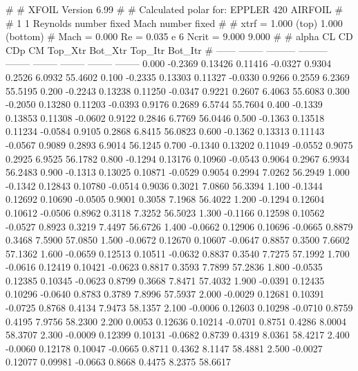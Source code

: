 #  
#       XFOIL         Version 6.99
#  
# Calculated polar for: EPPLER 420 AIRFOIL                              
#  
# 1 1 Reynolds number fixed          Mach number fixed         
#  
# xtrf =   1.000 (top)        1.000 (bottom)  
# Mach =   0.000     Re =     0.035 e 6     Ncrit =   9.000  9.000
#  
#   alpha    CL        CD       CDp       CM     Top_Xtr  Bot_Xtr  Top_Itr  Bot_Itr
#  ------ -------- --------- --------- -------- -------- -------- -------- --------
   0.000  -0.2369   0.13426   0.11416  -0.0327   0.9304   0.2526   6.0932  55.4602
   0.100  -0.2335   0.13303   0.11327  -0.0330   0.9266   0.2559   6.2369  55.5195
   0.200  -0.2243   0.13238   0.11250  -0.0347   0.9221   0.2607   6.4063  55.6083
   0.300  -0.2050   0.13280   0.11203  -0.0393   0.9176   0.2689   6.5744  55.7604
   0.400  -0.1339   0.13853   0.11308  -0.0602   0.9122   0.2846   6.7769  56.0446
   0.500  -0.1363   0.13518   0.11234  -0.0584   0.9105   0.2868   6.8415  56.0823
   0.600  -0.1362   0.13313   0.11143  -0.0567   0.9089   0.2893   6.9014  56.1245
   0.700  -0.1340   0.13202   0.11049  -0.0552   0.9075   0.2925   6.9525  56.1782
   0.800  -0.1294   0.13176   0.10960  -0.0543   0.9064   0.2967   6.9934  56.2483
   0.900  -0.1313   0.13025   0.10871  -0.0529   0.9054   0.2994   7.0262  56.2949
   1.000  -0.1342   0.12843   0.10780  -0.0514   0.9036   0.3021   7.0860  56.3394
   1.100  -0.1344   0.12692   0.10690  -0.0505   0.9001   0.3058   7.1968  56.4022
   1.200  -0.1294   0.12604   0.10612  -0.0506   0.8962   0.3118   7.3252  56.5023
   1.300  -0.1166   0.12598   0.10562  -0.0527   0.8923   0.3219   7.4497  56.6726
   1.400  -0.0662   0.12906   0.10696  -0.0665   0.8879   0.3468   7.5900  57.0850
   1.500  -0.0672   0.12670   0.10607  -0.0647   0.8857   0.3500   7.6602  57.1362
   1.600  -0.0659   0.12513   0.10511  -0.0632   0.8837   0.3540   7.7275  57.1992
   1.700  -0.0616   0.12419   0.10421  -0.0623   0.8817   0.3593   7.7899  57.2836
   1.800  -0.0535   0.12385   0.10345  -0.0623   0.8799   0.3668   7.8471  57.4032
   1.900  -0.0391   0.12435   0.10296  -0.0640   0.8783   0.3789   7.8996  57.5937
   2.000  -0.0029   0.12681   0.10391  -0.0725   0.8768   0.4134   7.9473  58.1357
   2.100  -0.0006   0.12603   0.10298  -0.0710   0.8759   0.4195   7.9756  58.2300
   2.200   0.0053   0.12636   0.10214  -0.0701   0.8751   0.4286   8.0004  58.3707
   2.300  -0.0009   0.12399   0.10131  -0.0682   0.8739   0.4319   8.0361  58.4217
   2.400  -0.0060   0.12178   0.10047  -0.0665   0.8711   0.4362   8.1147  58.4881
   2.500  -0.0027   0.12077   0.09981  -0.0663   0.8668   0.4475   8.2375  58.6617
